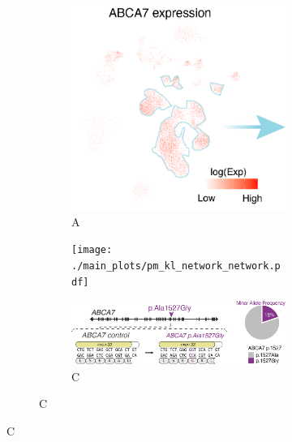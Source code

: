 \begin{figure}[H]
    \captionsetup[subfigure]{labelformat=empty}
    \begin{subfigure}[t]{0.47\textwidth}
        \begin{subfigure}[t]{0.49\textwidth}
            \caption{A}
            \includegraphics[width=\textwidth]{./main_plots/cell_projection_abca7_expression.png}        
        \end{subfigure}
        \begin{subfigure}[t]{0.49\textwidth}
            \vspace{1cm}
            \texttt{[image: ./main\_plots/pm\_kl\_network\_network.pdf]}        
        \end{subfigure}
        \begin{subfigure}[t]{\textwidth}
            \caption{C}
            \includegraphics[width=\textwidth]{./main_plots/common_variant_cartoon.png}        
        \end{subfigure}

\end{subfigure}
\end{figure}
